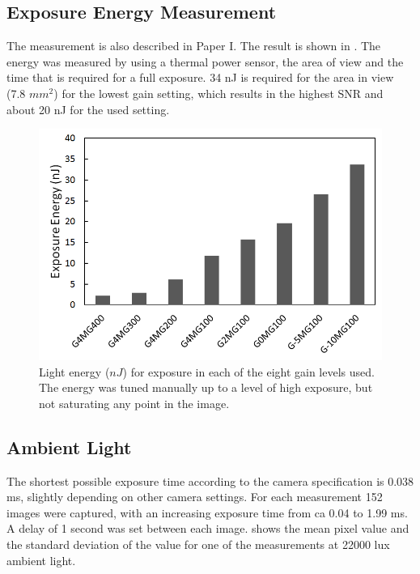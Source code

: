\subsection{Exposure Energy Measurement}
\label{sec:expmeasurement}

The measurement is also described in Paper I. The result is shown in . The energy was measured by using a thermal power sensor, the area of view and the time that is required for a full exposure. 34 nJ is required for the area in view (7.8 $mm^2$) for the lowest gain setting, which results in the highest SNR and about 20 nJ for the used setting.

\begin{figure}[ht]
\centering\includegraphics[width=0.75\linewidth]{figures/Energy_per_gain_level2}
\caption{Light energy ($nJ$) for exposure in each of the eight gain levels used. The energy was tuned manually up to a level of high exposure, but not saturating any point in the image.}
\label{fig:expenergy}
\end{figure}

\subsection{Ambient Light}

The shortest possible exposure time according to the camera specification is 0.038 ms, slightly depending on other camera settings. For each measurement 152 images were captured, with an increasing exposure time from ca 0.04 to 1.99 ms. A delay of 1 second was set between each image.  shows the mean pixel value and the standard deviation of the value for one of the measurements at 22000 lux ambient light.

